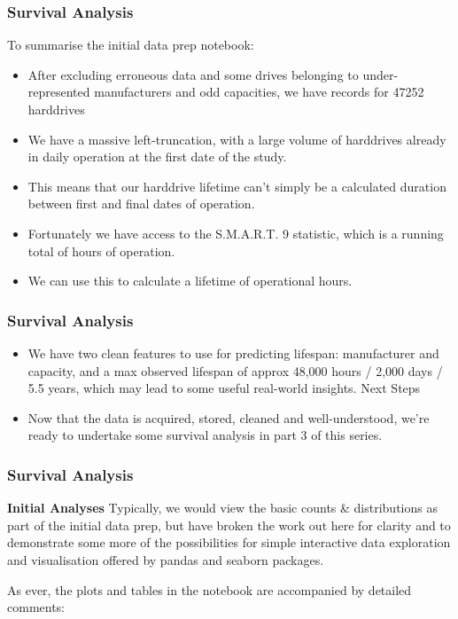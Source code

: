 \documentclass[]{beamer}
\begin{document}
	\begin{frame}
		\frametitle{Survival Analysis}
		
		To summarise the initial data prep notebook:
		\begin{itemize}
			\item After excluding erroneous data and some drives belonging to under-represented manufacturers and odd capacities, we have records for 47252 harddrives
			\item We have a massive left-truncation, with a large volume of harddrives already in daily operation at the first date of the study. 
			\item This means that our harddrive lifetime can't simply be a calculated duration between first and final dates of operation.
			\item Fortunately we have access to the S.M.A.R.T. 9 statistic, which is a running total of hours of operation. 
			\item We can use this to calculate a lifetime of operational hours.
		\end{itemize}
		
	\end{frame}
	\begin{frame}
		\frametitle{Survival Analysis}
		\begin{itemize}
			\item We have two clean features to use for predicting lifespan: manufacturer and capacity, and a max observed lifespan of approx 48,000 hours / 2,000 days / 5.5 years, which may lead to some useful real-world insights.
			Next Steps
			
			\item Now that the data is acquired, stored, cleaned and well-understood, we're ready to undertake some survival analysis in part 3 of this series.
			
		\end{itemize}	
		
	\end{frame}
	\begin{frame}
		\frametitle{Survival Analysis}
		\noindent \textbf{Initial Analyses}
		Typically, we would view the basic counts \& distributions as part of the initial data prep, but have broken the work out here for clarity and to demonstrate some more of the possibilities for simple interactive data exploration and visualisation offered by pandas and seaborn packages.
		
		As ever, the plots and tables in the notebook are accompanied by detailed comments:
		
	\end{frame}
\end{document}
